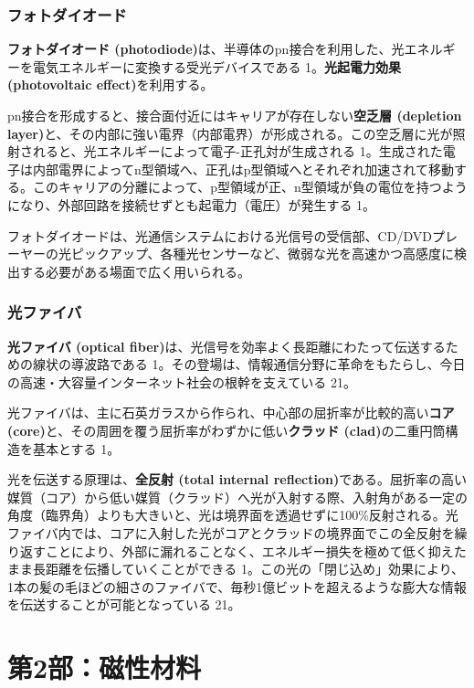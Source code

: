 \documentclass[11pt,a4paper]{ltjsarticle}
\begin{document}
\subsubsection*{フォトダイオード}

\textbf{フォトダイオード (photodiode)}は、半導体のpn接合を利用した、光エネルギーを電気エネルギーに変換する受光デバイスである 1。\textbf{光起電力効果 (photovoltaic effect)}を利用する。

pn接合を形成すると、接合面付近にはキャリアが存在しない\textbf{空乏層 (depletion layer)}と、その内部に強い電界（内部電界）が形成される。この空乏層に光が照射されると、光エネルギーによって電子-正孔対が生成される 1。生成された電子は内部電界によってn型領域へ、正孔はp型領域へとそれぞれ加速されて移動する。このキャリアの分離によって、p型領域が正、n型領域が負の電位を持つようになり、外部回路を接続せずとも起電力（電圧）が発生する 1。

フォトダイオードは、光通信システムにおける光信号の受信部、CD/DVDプレーヤーの光ピックアップ、各種光センサーなど、微弱な光を高速かつ高感度に検出する必要がある場面で広く用いられる。

\subsubsection*{光ファイバ}

\textbf{光ファイバ (optical fiber)}は、光信号を効率よく長距離にわたって伝送するための線状の導波路である 1。その登場は、情報通信分野に革命をもたらし、今日の高速・大容量インターネット社会の根幹を支えている 21。

光ファイバは、主に石英ガラスから作られ、中心部の屈折率が比較的高い\textbf{コア (core)}と、その周囲を覆う屈折率がわずかに低い\textbf{クラッド (clad)}の二重円筒構造を基本とする 1。

光を伝送する原理は、\textbf{全反射 (total internal reflection)}である。屈折率の高い媒質（コア）から低い媒質（クラッド）へ光が入射する際、入射角がある一定の角度（臨界角）よりも大きいと、光は境界面を透過せずに100\%反射される。光ファイバ内では、コアに入射した光がコアとクラッドの境界面でこの全反射を繰り返すことにより、外部に漏れることなく、エネルギー損失を極めて低く抑えたまま長距離を伝播していくことができる 1。この光の「閉じ込め」効果により、1本の髪の毛ほどの細さのファイバで、毎秒1億ビットを超えるような膨大な情報を伝送することが可能となっている 21。

\section*{第2部：磁性材料}
\end{document}
